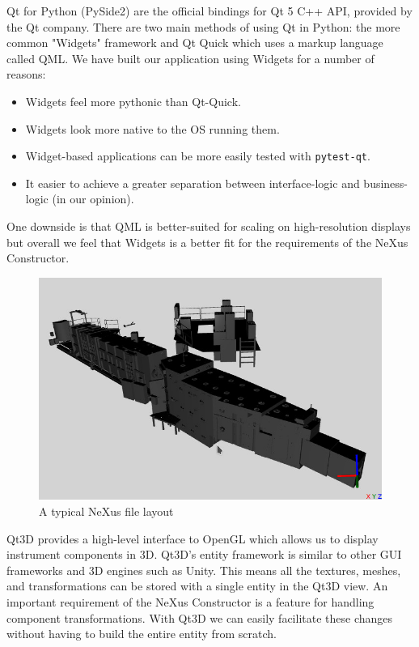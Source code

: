 Qt for Python (PySide2) are the official bindings for Qt 5 C++ API, provided by the Qt company. There are two main methods of using Qt in Python: the more common "Widgets" framework and Qt Quick which uses a markup language called QML. We have built our application using Widgets for a number of reasons: 
\begin{itemize}
\item Widgets feel more pythonic than Qt-Quick.
\item Widgets look more native to the OS running them.
\item Widget-based applications can be more easily tested with \texttt{pytest-qt}.
\item It easier to achieve a greater separation between interface-logic and business-logic (in our opinion).
\end{itemize}

One downside is that QML is better-suited for scaling on high-resolution displays but overall we feel that Widgets is a better fit for the requirements of the NeXus Constructor.

\begin{figure}
\begin{center}
\includegraphics[width=\linewidth]{zoom.jpg}
\end{center}
\caption{A typical NeXus file layout}
\end{figure}

Qt3D provides a high-level interface to OpenGL which allows us to display instrument components in 3D. Qt3D's entity framework is similar to other GUI frameworks and 3D engines such as Unity. This means all the textures, meshes, and transformations can be stored with a single entity in the Qt3D view. An important requirement of the NeXus Constructor is a feature for handling component transformations. With Qt3D we can easily facilitate these changes without having to build the entire entity from scratch.

\vspace{1.8cm}
